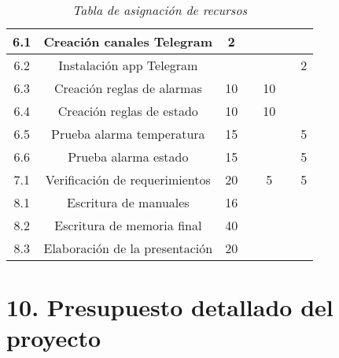 \documentclass[11pt]{proyecto}
\begin{document}
\begin{table}
{\begin{tabular}{|c|c|c|c|c|c|c|}
  6.1&Creación canales Telegram  & 2 &  &  &  &\\ \hline
 6.2&Instalación app Telegram &  &  &  &  &2\\ \hline
 6.3&Creación reglas de alarmas & 10 &  & 10 &  &\\ \hline
 6.4&Creación reglas de estado &  10 &  & 10 &  &\\ \hline
 6.5&Prueba alarma temperatura & 15 &  &  &  &5\\ \hline
 6.6&Prueba alarma estado & 15 &  &  &  &5\\ \hline
 7.1&Verificación de requerimientos & 20  &  &5  &  &5\\ \hline
 8.1&Escritura de manuales & 16 &  &  &  &\\ \hline
 8.2&Escritura de memoria final & 40 &  &  &  &\\ \hline
 8.3&Elaboración de la presentación & 20 &  &  &  &\\ \hline
 \end{tabular}%
 }
 \caption{\textit{Tabla de asignación de recursos}}
 \label{recursos1}
 \end{table}
 
\section{10. Presupuesto detallado del proyecto}
\label{sec:presupuesto}
\end{document}
